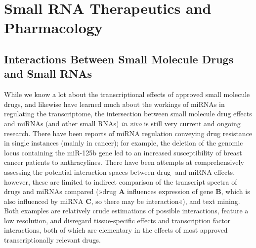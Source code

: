 \section{Small RNA Therapeutics and Pharmacology} \label{sec:discussion:therapy}
\subsection{Interactions Between Small Molecule Drugs and Small RNAs}
While we know a lot about the transcriptional effects of approved small molecule drugs, and likewise have learned much about the workings of miRNAs in regulating the transcriptome, the intersection between small molecule drug effects and miRNAs (and other small RNAs) \emph{in vivo} is still very current and ongoing research. There have been reports of miRNA regulation conveying drug resistance in single instances (mainly in cancer);\cite{Ma2010} for example, the deletion of the genomic locus containing the miR-125b gene led to an increased susceptibility of breast cancer patients to anthracylines.\cite{Climent2007} There have been attempts at comprehensively assessing the potential interaction spaces between drug- and miRNA-effects,\cite{Meng2016, Xie2019} however, these are limited to indirect comparison of the transcript spectra of drugs and miRNAs compared (»drug \textbf{A} influences expression of gene \textbf{B}, which is also influenced by miRNA \textbf{C}, so there may be interaction«), and text mining. Both examples are relatively crude estimations of possible interactions, feature a low resolution, and disregard tissue-specific effects and transcription factor interactions, both of which are elementary in the effects of most approved transcriptionally relevant drugs.\cite{Clayton2018}

